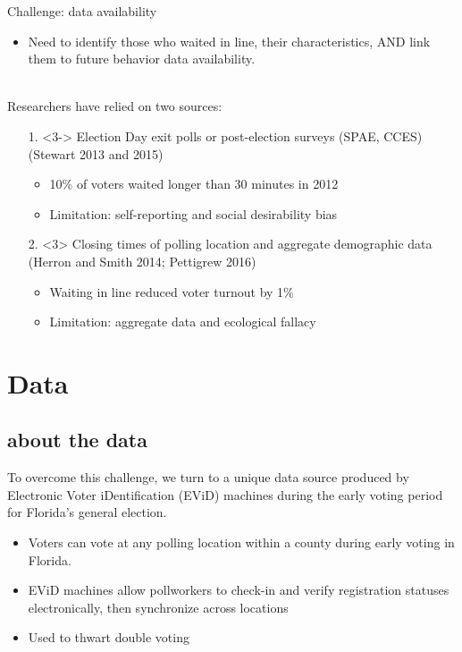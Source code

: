 \documentclass{beamer}
\begin{document}
	\begin{frame}
		Challenge: data availability 
			\begin{itemize}
				\item<2-> Need to identify those who waited in line, their characteristics, AND link them to future behavior data availability.\\~\\
			\end{itemize}
		Researchers have relied on two sources:
			\begin{itemize}
				\item[1.]<3-> Election Day exit polls or post-election surveys (SPAE, CCES) {\tiny (Stewart 2013 and 2015)}
					\begin{itemize}
						\item<3-> {\small 10\% of voters waited longer than 30 minutes in 2012}
						\item<3-> {\small Limitation: self-reporting and social desirability bias}
					\end{itemize}
				\item[2.]<3> Closing times of polling location and aggregate demographic data {\tiny (Herron and Smith 2014; Pettigrew 2016)}
					\begin{itemize}
						\item<3-> {\small Waiting in line reduced voter turnout by 1\%}
						\item<3-> {\small Limitation: aggregate data and ecological fallacy}
					\end{itemize}
			\end{itemize}
	\end{frame}
		
	
	\section{Data}
	\subsection{about the data}
		\begin{frame}
		 To overcome this challenge, we turn to a unique data source produced by Electronic Voter iDentification (EViD) machines during the early voting period for Florida's general election. 
		 	\begin{itemize}
				\item<2->  Voters can vote at any polling location within a county during early voting in Florida.
				\item<2-> EViD machines allow pollworkers to check-in and verify registration statuses electronically, then synchronize across locations
				\item<2-> Used to thwart double voting 
			\end{itemize}
		\end{frame}
		
\end{document}
